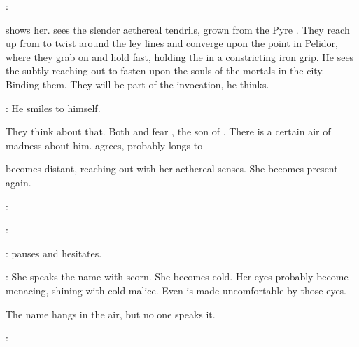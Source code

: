 \begin{prose}
  \Vizsherioch: 
  
  \Psyrex shows her. 
  \Takestsha sees the slender aethereal tendrils, grown from the Pyre \matrix.
  They reach up from \Nithdornazsh to twist around the ley lines and converge upon the \nexus point in Pelidor, where they grab on and hold fast, holding the \nexus in a constricting iron grip. 
  He sees the \matrix subtly reaching out to fasten upon the souls of the mortals in the city. 
  Binding them.
  They will be part of the invocation, he thinks. 
  
  \Takestsha: 
  He smiles to himself.
  
  They think about that.
  Both \Takestsha and \Psyrex fear \Vizsherioch, the son of \Secherdamon.
  There is a certain air of madness about him. 
  \Psyrex agrees, \Vizsherioch probably longs to 
  
  \Takestsha becomes distant, reaching out with her aethereal senses.
  She becomes present again.
  
  \Psyrex:
  
  \Takestsha:
  
  \Psyrex:
  \Psyrex pauses and hesitates. 
  
  \Takestsha: 
  She speaks the name with scorn. 
  She becomes cold. 
  Her eyes probably become menacing, shining with cold \ophidian malice.
  Even \Psyrex is made uncomfortable by those eyes.
  
  The name \quo{\QuessanthIshnaruchaefir} hangs in the air, but no one speaks it. 
  
  \Psyrex:
  

\end{prose}

